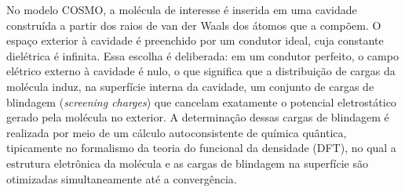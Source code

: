 No modelo COSMO, a molécula de interesse é inserida em uma cavidade construída a partir dos raios de van der Waals dos átomos que a compõem. O espaço exterior à cavidade é preenchido por um condutor ideal, cuja constante dielétrica é infinita\cite{klamt1993}. Essa escolha é deliberada: em um condutor perfeito, o campo elétrico externo à cavidade é nulo, o que significa que a distribuição de cargas da molécula induz, na superfície interna da cavidade, um conjunto de cargas de blindagem (\textit{screening charges}) que cancelam exatamente o potencial eletrostático gerado pela molécula no exterior. A determinação dessas cargas de blindagem é realizada por meio de um cálculo autoconsistente de química quântica, tipicamente no formalismo da teoria do funcional da densidade (DFT), no qual a estrutura eletrônica da molécula e as cargas de blindagem na superfície são otimizadas simultaneamente até a convergência\cite{klamt1995}.

